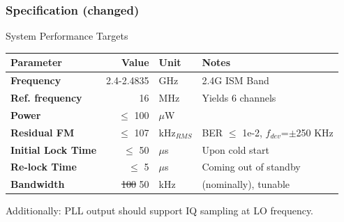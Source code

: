 \documentclass[t, screen, aspectratio=43]{beamer}
\begin{document}
\begin{frame}
	\frametitle{Specification \color{red}(changed)\color{black}}
	\begin{block}{System Performance Targets}
		\scriptsize
		\begin{table}[h!]
			\centering
			\def\arraystretch{1.5}		
			\setlength\arrayrulewidth{0.75pt}
			\setlength{\tabcolsep}{1em} %
			\begin{tabular}{|l|r|l|l|}
				\hline 
				\rule[-1ex]{0pt}{2.5ex} \cellcolor{gray!40}\textbf{Parameter} & \cellcolor{gray!40}\textbf{Value} & \cellcolor{gray!40}\textbf{Unit }& \cellcolor{gray!40}\textbf{Notes}\\ 
				\hline 
				\rule[-1ex]{0pt}{2.5ex} \textbf{Frequency}  & 2.4-2.4835 & GHz & 2.4G ISM Band\\ 
				\hline 
				\rule[-1ex]{0pt}{2.5ex} \textbf{Ref. frequency} & 16 & MHz & Yields 6 channels \\ 
				\hline 
				\rule[-1ex]{0pt}{2.5ex} \textbf{Power} & $\leq$ 100  &$\mu$W & \\ 
				\hline 
				\rule[-1ex]{0pt}{2.5ex} \textbf{Residual FM} & $\leq$ 107  &kHz$_{RMS}$ & BER $\leq$ 1e-2, $f_{dev}$=$\pm$250 KHz\\ 
				\hline 
				\rule[-1ex]{0pt}{2.5ex} \textbf{Initial Lock Time} & $\leq$ 50 & $\mu$s & Upon cold start \\ 
				\hline 
				\rule[-1ex]{0pt}{2.5ex} \textbf{Re-lock Time} & $\leq$ 5 & $\mu$s & Coming out of standby \\ 
				\hline 
				\rule[-1ex]{0pt}{2.5ex} \color{red}\textbf{Bandwidth} & \sout{100} \color{red}50 & \color{red}kHz & \color{red}(nominally), tunable \\ 
				\hline 
			\end{tabular} 
		\end{table}   
		Additionally: PLL output should support IQ sampling at LO frequency.
	\end{block}    
\end{frame}
\end{document}
